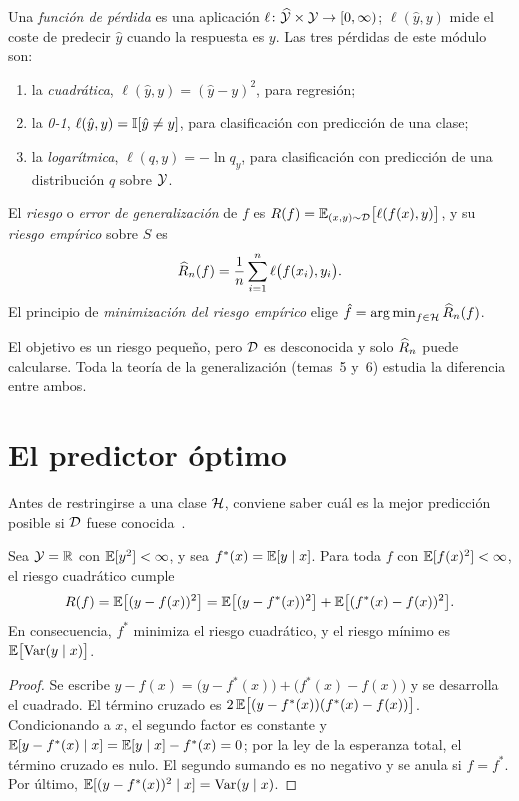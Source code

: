 \begin{definicion}\label{def:riesgo}
Una \emph{función de pérdida} es una aplicación $\ell\colon\widehat{\mathcal{Y}}\times\mathcal{Y}\to[0,\infty)$; $\ell(\hat y,y)$ mide el coste de predecir $\hat y$ cuando la respuesta es $y$. Las tres pérdidas de este módulo son:
\begin{enumerate}
  \item la \emph{cuadrática}, $\ell(\hat y,y)=(\hat y-y)^{2}$, para regresión;
  \item la \emph{0-1}, $\ell(\hat y,y)=\mathbb{I}[\hat y\ne y]$, para clasificación con predicción de una clase;
  \item la \emph{logarítmica}, $\ell(q,y)=-\ln q_y$, para clasificación con predicción de una distribución $q$ sobre $\mathcal{Y}$.
\end{enumerate}
El \emph{riesgo} o \emph{error de generalización} de $f$ es $R(f)=\mathbb{E}_{(x,y)\sim\mathcal{D}}\bigl[\ell(f(x),y)\bigr]$, y su \emph{riesgo empírico} sobre $S$ es
\[
\widehat{R}_n(f)=\frac{1}{n}\sum_{i=1}^{n}\ell\bigl(f(x_i),y_i\bigr).
\]
El principio de \emph{minimización del riesgo empírico} elige $\hat f=\operatorname*{arg\,min}_{f\in\mathcal{H}}\widehat{R}_n(f)$.
\end{definicion}

El objetivo es un riesgo pequeño, pero $\mathcal{D}$ es desconocida y solo $\widehat{R}_n$ puede calcularse. Toda la teoría de la generalización (temas~5 y~6) estudia la diferencia entre ambos.

\section{El predictor óptimo}

Antes de restringirse a una clase $\mathcal{H}$, conviene saber cuál es la mejor predicción posible si $\mathcal{D}$ fuese conocida~\cite[§2.4]{esl}.

\begin{teorema}\label{teo:regresion}
Sea $\mathcal{Y}=\mathbb{R}$ con $\mathbb{E}[y^{2}]<\infty$, y sea $f^{*}(x)=\mathbb{E}[y\mid x]$. Para toda $f$ con $\mathbb{E}[f(x)^{2}]<\infty$, el riesgo cuadrático cumple
\[
R(f)=\mathbb{E}\bigl[(y-f(x))^{2}\bigr]=\mathbb{E}\bigl[(y-f^{*}(x))^{2}\bigr]+\mathbb{E}\bigl[(f^{*}(x)-f(x))^{2}\bigr].
\]
En consecuencia, $f^{*}$ minimiza el riesgo cuadrático, y el riesgo mínimo es $\mathbb{E}\bigl[\operatorname{Var}(y\mid x)\bigr]$.
\end{teorema}

\begin{proof}
Se escribe $y-f(x)=\bigl(y-f^{*}(x)\bigr)+\bigl(f^{*}(x)-f(x)\bigr)$ y se desarrolla el cuadrado. El término cruzado es $2\,\mathbb{E}\bigl[(y-f^{*}(x))(f^{*}(x)-f(x))\bigr]$. Condicionando a $x$, el segundo factor es constante y $\mathbb{E}[y-f^{*}(x)\mid x]=\mathbb{E}[y\mid x]-f^{*}(x)=0$; por la ley de la esperanza total, el término cruzado es nulo. El segundo sumando es no negativo y se anula si $f=f^{*}$. Por último, $\mathbb{E}[(y-f^{*}(x))^{2}\mid x]=\operatorname{Var}(y\mid x)$.
\end{proof}

